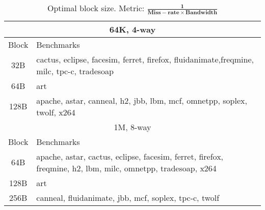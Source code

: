 
\begin{table}[!h]
\caption{Optimal block size. Metric: $\mathbf{\frac{1}{Miss-rate \times Bandwidth}}$}
\label{table:bwmr_classify}
\begin{center}
{
\small
  \begin{tabular}{ |@{~}c@{~}| m{} |}
    \hline
    \multicolumn{2}{|c|}{64K, 4-way} \\
    \hline
    Block  & Benchmarks \\
    \hline
    32B   & cactus, eclipse, facesim, ferret, firefox, fluidanimate,freqmine, milc, tpc-c, tradesoap \\
    \hline
    64B   &  art \\
    \hline
    128B  & apache, astar, canneal, h2, jbb, lbm, mcf, omnetpp, soplex, twolf, x264 \\
    \hline
    \multicolumn{2}{|c|}{1M, 8-way} \\
    \hline
    Block & Benchmarks \\
    \hline
    64B  & apache, astar, cactus, eclipse, facesim, ferret, firefox, freqmine, h2, lbm, milc, omnetpp, tradesoap, x264\\
    \hline
    128B & art\\
    \hline
    256B  & canneal, fluidanimate, jbb, mcf, soplex, tpc-c, twolf\\
    \hline
  \end{tabular}
}
\end{center}
\end{table}

